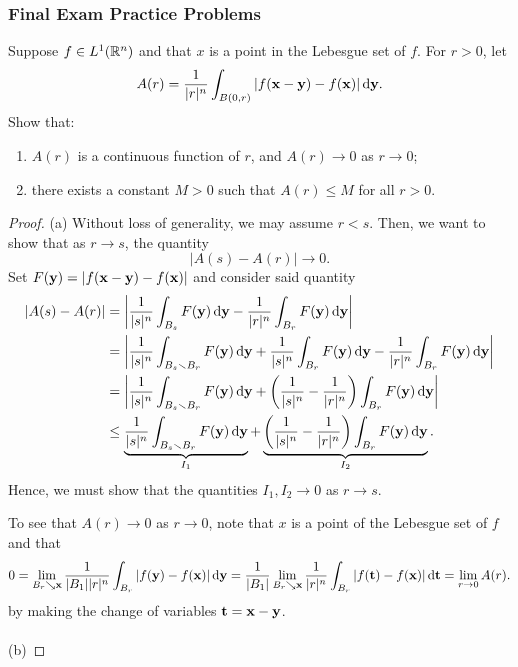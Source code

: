 \subsubsection{Final Exam Practice Problems}
\setcounter{exercise}{0}

\begin{problem}
Suppose $f\in L^1(\mathbb{R}^n)$ and that $x$ is a point in the Lebesgue set of
$f$. For $r>0$, let
\[
A(r)=\frac{1}{|r|^n}\int_{B(0,r)}|f(\mathbf{x}-\mathbf{y})-f(\mathbf{x})|\mathop{}\!\mathrm{d}\mathbf{y}.
\]
Show that:
\begin{enumerate}[label=(\alph*),noitemsep]
\item $A(r)$ is a continuous function of $r$, and $A(r)\to 0$ as $r\to 0$;
\item there exists a constant $M>0$ such that $A(r)\leq M$ for all $r>0$.
\end{enumerate}
\end{problem}
\begin{proof}
(a) Without loss of generality, we may assume $r<s$. Then, we want to show
that as $r\to s$, the quantity
\[
|A(s)-A(r)|\longrightarrow 0.
\]
Set $F(\mathbf{y})= |f(\mathbf{x}-\mathbf{y})-f(\mathbf{x})|$ and consider said quantity
\begin{align*}
|A(s)-A(r)|
&=\left|
\frac{1}{|s|^n}\int_{B_s}F(\bfy)\diff\bfy
-
\frac{1}{|r|^n}\int_{B_r}F(\bfy)\diff\bfy
\right|\\
&=\left|
\frac{1}{|s|^n}\int_{B_s\smallsetminus B_r}F(\bfy)\diff\bfy+
\frac{1}{|s|^n}\int_{B_r}F(\bfy)\diff\bfy-
\frac{1}{|r|^n}\int_{B_r}F(\bfy)\diff\bfy
\right|\\
&=\left|
\frac{1}{|s|^n}\int_{B_s\smallsetminus B_r}F(\bfy)\diff\bfy
+\left(\frac{1}{|s|^n}-\frac{1}{|r|^n}\right)\int_{B_r}F(\bfy)\diff\bfy
\right|\\
&\leq
\underbrace{\frac{1}{|s|^n}\int_{B_s\smallsetminus B_r}F(\bfy)\diff\bfy}_{I_1}
+\underbrace{\left(\frac{1}{|s|^n}-\frac{1}{|r|^n}\right)\int_{B_r}F(\bfy)\diff\bfy}_{I_2}.
\end{align*}
Hence, we must show that the quantities $I_1,I_2\to 0$ as $r\to s$.

To see that $A(r)\to 0$ as $r\to 0$, note that $x$ is a point of the
Lebesgue set of $f$ and that
\[
0=\lim_{B_r\searrow\mathbf{x}}\frac{1}{|B_1||r|^n}\int_{B_r}|f(\mathbf{y})-f(\mathbf{x})|\mathop{}\!\mathrm{d}\mathbf{y}=\frac{1}{|B_1|}\lim_{B_r\searrow\mathbf{x}}\frac{1}{|r|^n}\int_{B_r}|f(\mathbf{t})-f(\mathbf{x})|\mathop{}\!\mathrm{d}\mathbf{t}=\lim_{r\to
0}A(r).
\]
by making the change of variables $\mathbf{t}=\mathbf{x}-\mathbf{y}$.
\\\\
(b)
\end{proof}

